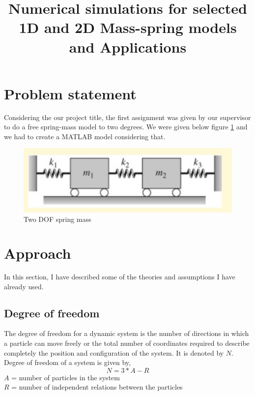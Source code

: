 \documentclass[extendedabs]{AAVL}
\begin{document}
\title{Numerical simulations for selected 1D and 2D Mass-spring
models and Applications}




\maketitle
\section{Problem statement}
\label{aa}

\noindent
Considering the our project title, the first assignment was given by our supervisor to do a free spring-mass model to two degrees. We were given below figure \ref{fig:b} and we had to create a MATLAB model considering that. 
\begin{figure}[hbt!]
\includegraphics[width=\linewidth]{images/b.jpg}
\caption{Two DOF spring mass }
\vspace{-2mm}
\label{fig:b}
\end{figure}

\section{Approach}
In this section, I have described some of the theories and assumptions I have already used. 
\subsection{Degree of freedom}
The degree of freedom for a dynamic system is the number of directions in which a particle can move freely or the total number of coordinates required to describe completely the position and configuration of the system. It is denoted by $N$. Degree of freedom of a system is given by, 
\begin{equation}
    N = 3*A-R
\end{equation}
$A$ = number of particles in the system \\
$R$ = number of independent relations between the particles
\end{document}

